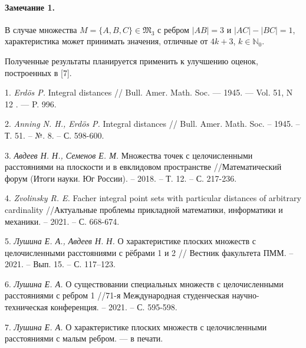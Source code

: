 \paragraph{Замечание 1.}
В случае множества $M=\{A, B, C\} \in \mathfrak{M}_{3}$ с ребром $|AB|=3$ и $|AC|-|BC|=1$, характеристика может принимать значения, отличные от $4k+3$, $k\in\mathbb{N}_{0}$.

Полученные результаты планируется применить к улучшению оценок, построенных в [7].

\litlist

1. {\it Erdös P.}
Integral distances // Bull. Amer. Math. Soc. — 1945. — Vol. 51, N 12 . — P. 996.

2. {\it Anning N. H., Erdös P. }
Integral distances // Bull. Amer. Math. Soc. – 1945. – Т. 51. – №. 8. – С. 598-600.

3. {\it Авдеев Н. Н., Семенов Е. М.}
Множества точек с целочисленными расстояниями на плоскости и в евклидовом пространстве //Математический форум (Итоги науки. Юг России). – 2018. – Т. 12. – С. 217-236.

4. {\it Zvolinsky R. E.}
Facher integral point sets with particular distances of arbitrary cardinality //Актуальные проблемы прикладной математики, информатики и механики. – 2021. – С. 668-674.

5. {\it Лушина Е. А., Авдеев Н. Н.}
О характеристике плоских множеств с целочисленными
расстояниями с рёбрами 1 и 2 // Вестник факультета ПММ. – 2021. – Вып. 15. – С.
117–123.

6. {\it Лушина Е. А.}
О существовании специальных множеств с целочисленными расстояниями с ребром 1 //71-я Международная студенческая научно-техническая конференция. – 2021. – С. 595-598.

7. {\it Лушина Е. А.}
О характеристике плоских множеств с целочисленными расстояниями с малым ребром. --- в печати.


